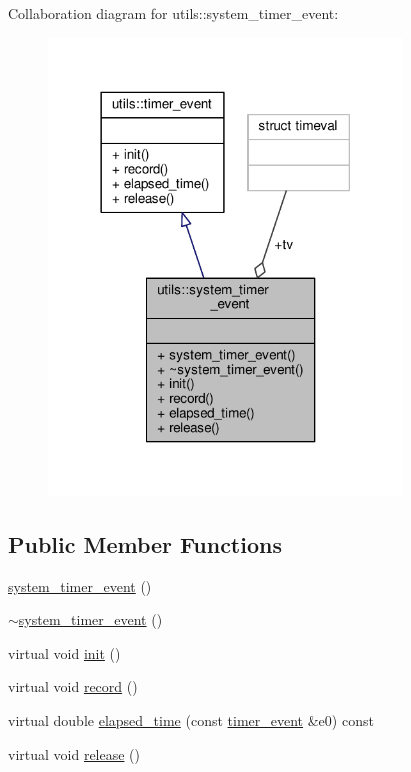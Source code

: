 Collaboration diagram for utils\-:\-:system\-\_\-timer\-\_\-event\-:\nopagebreak
\begin{figure}[H]
\begin{center}
\leavevmode
\includegraphics[width=266pt]{structutils_1_1system__timer__event__coll__graph}
\end{center}
\end{figure}
\subsection*{Public Member Functions}
\begin{DoxyCompactItemize}
\item 
\hyperlink{structutils_1_1system__timer__event_a1920c1d39f2cdd3f906136ca1078a5e0}{system\-\_\-timer\-\_\-event} ()
\item 
\hyperlink{structutils_1_1system__timer__event_aac8289d13234a88148486ef7cd79045d}{$\sim$system\-\_\-timer\-\_\-event} ()
\item 
virtual void \hyperlink{structutils_1_1system__timer__event_a71f9a9e0ff689a510ed2f1035a5b39ec}{init} ()
\item 
virtual void \hyperlink{structutils_1_1system__timer__event_acedb8d5acbeb6e11366aa8253b3f00b7}{record} ()
\item 
virtual double \hyperlink{structutils_1_1system__timer__event_a9d0cc042f07a406cb43946aec96ba470}{elapsed\-\_\-time} (const \hyperlink{structutils_1_1timer__event}{timer\-\_\-event} \&e0) const 
\item 
virtual void \hyperlink{structutils_1_1system__timer__event_a544e19f0a36e569d959d5c092050383b}{release} ()
\end{DoxyCompactItemize}
